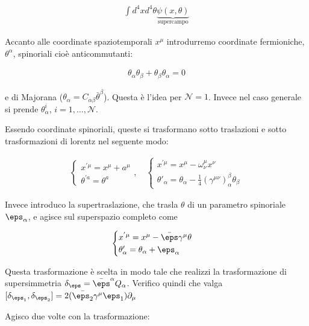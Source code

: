 \documentclass{report}
\begin{document}
\begin{align}
    \int d^4x d^4 \theta \underbrace{\psi(x, \theta)}_{\text{supercampo}}
\end{align}

Accanto alle coordinate spaziotemporali \(x^\mu\) introdurremo coordinate fermioniche, \(\theta^\alpha\), spinoriali cioè anticommutanti: 

\begin{align}
    \theta_\alpha \theta_\beta + \theta_\beta \theta_\alpha = 0 
\end{align}

e di Majorana (\(\theta_\alpha = C_{\alpha\beta}\bar{\theta}^\beta\)). Questa è l'idea per \(\mathcal{N} = 1\). Invece nel caso generale si prende \(\theta_\alpha^i\), \(i = 1, \ldots, \mathcal{N}\). 

Essendo coordinate spinoriali, queste si trasformano sotto traslazioni e sotto trasformazioni di lorentz nel seguente modo: 

\begin{align}
    \begin{cases}
        x^{'\mu} = x^\mu + a^\mu \\ \theta^{'a} = \theta^a  
    \end{cases}, \quad \begin{cases}
        x^{'\mu} = x^\mu - \omega^\mu_\nu x^\nu \\ \theta'_\alpha = \theta_\alpha -\frac{1}{4}(\gamma^{\mu\nu})^\beta_\alpha \theta_\beta
    \end{cases}
\end{align}

Invece introduco la supertraslazione, che trasla \(\theta\) di un parametro spinoriale \(\eps_\alpha\), e agisce sul superspazio completo come 

\begin{align}
    \begin{cases}
        x^{'\mu} = x^{\mu} - \bar{\eps}\gamma^\mu \theta \\ \theta'_\alpha = \theta_\alpha + \eps_\alpha
    \end{cases}
\end{align}

Questa trasformazione è scelta in modo tale che realizzi la trasformazione di supersimmetria \(\delta_\eps = \bar{\eps}^\alpha Q_\alpha\). Verifico quindi che valga \([\delta_{\eps_1}, \delta_{\eps_2}] = 2(\bar{\eps_2}\gamma^\mu \eps_1)\partial_\mu\)

Agisco due volte con la trasformazione: 
\end{document}
